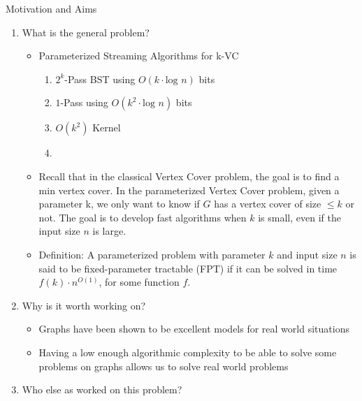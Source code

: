 Motivation and Aims

\begin{enumerate}
    \item What is the general problem?
    \begin{itemize}
        \item Parameterized Streaming Algorithms for k-VC
        \begin{enumerate}
            \item $2^k$-Pass BST using $O(k \cdot \text{log } n)$ bits
            \item $1$-Pass using $O(k^2 \cdot \text{log } n)$ bits
            \item $O(k^2)$ Kernel
            \item {}
        \end{enumerate}
        \item {}Recall that in the classical Vertex Cover problem, the goal is to find a min vertex cover. In the parameterized Vertex Cover problem, given a parameter k, we only want to know if $G$ has a vertex cover of size $\leq k$ or not. The goal is to develop fast algorithms when $k$ is small, even if the input size $n$ is large.
        \item Definition: A parameterized problem with parameter $k$ and input size $n$ is said to be fixed-parameter tractable (FPT) if it can be solved in time $f(k) \cdot n^{O(1)}$, for some function $f$.
    \end{itemize}
    \item Why is it worth working on?
    \begin{itemize}
        \item Graphs have been shown to be excellent models for real world situations
        \item Having a low enough algorithmic complexity to be able to solve some problems on graphs allows us to solve real world problems
    \end{itemize}
    \item Who else as worked on this problem?

\end{enumerate}
